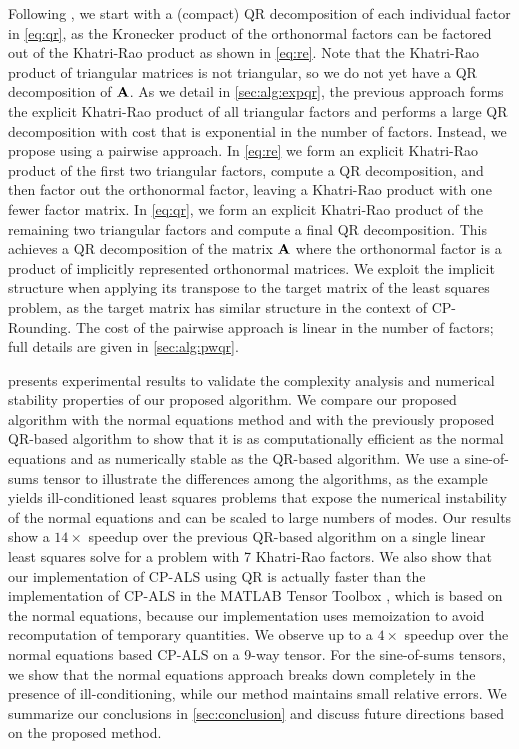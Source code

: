 \documentclass{article}
\newcommand{\M}[2][]{\bm{#1{\mathbf{\MakeUppercase{#2}}}}} 		%
\begin{document}
Following \cite{MVLB23}, we start with a (compact) QR decomposition of each individual factor in \cref{eq:qr}, as the Kronecker product of the orthonormal factors can be factored out of the Khatri-Rao product as shown in \cref{eq:re}.
Note that the Khatri-Rao product of triangular matrices is not triangular, so we do not yet have a QR decomposition of $\M{A}$.
As we detail in \cref{sec:alg:expqr}, the previous approach forms the explicit Khatri-Rao product of all triangular factors and performs a large QR decomposition with cost that is exponential in the number of factors.
Instead, we propose using a pairwise approach.
In \cref{eq:re} we form an explicit Khatri-Rao product of the first two triangular factors, compute a QR decomposition, and then factor out the orthonormal factor, leaving a Khatri-Rao product with one fewer factor matrix.
In \cref{eq:qr}, we form an explicit Khatri-Rao product of the remaining two triangular factors and compute a final QR decomposition.
This achieves a QR decomposition of the matrix $\M{A}$ where the orthonormal factor is a product of implicitly represented orthonormal matrices.
We exploit the implicit structure when applying its transpose to the target matrix of the least squares problem, as the target matrix has similar structure in the context of CP-Rounding. 
The cost of the pairwise approach is linear in the number of factors; full details are given in \cref{sec:alg:pwqr}.
 
 presents experimental results to validate the complexity analysis and numerical stability properties of our proposed algorithm.
We compare our proposed algorithm with the normal equations method and with the previously proposed QR-based algorithm to show that it is as computationally efficient as the normal equations and as numerically stable as the QR-based algorithm.
We use a sine-of-sums tensor \cite{BM02} to illustrate the differences among the algorithms, as the example yields ill-conditioned least squares problems that expose the numerical instability of the normal equations and can be scaled to large numbers of modes.
Our results show a $14\times$ speedup over the previous QR-based algorithm on a single linear least squares solve for a problem with 7 Khatri-Rao factors.
We also show that our implementation of CP-ALS using QR is actually faster than the implementation of CP-ALS in the MATLAB Tensor Toolbox \cite{TensorToolbox}, which is based on the normal equations, because our implementation uses memoization to avoid recomputation of temporary quantities.
We observe up to a $4\times$ speedup over the normal equations based CP-ALS on a 9-way tensor.
For the sine-of-sums tensors, we show that the normal equations approach breaks down completely in the presence of ill-conditioning, while our method maintains small relative errors.
We summarize our conclusions in \cref{sec:conclusion} and discuss future directions based on the proposed method.
\end{document}
